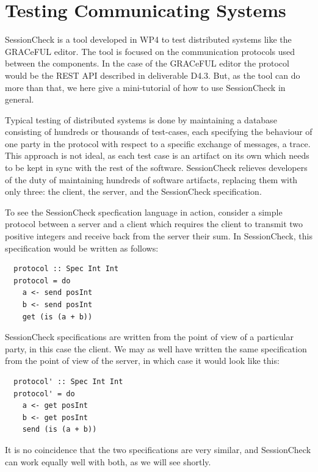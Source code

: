 \documentclass{article}
\begin{document}


\section{Testing Communicating Systems}
%
SessionCheck \cite{SessionCheck} is a tool developed in WP4 to test distributed systems like
the GRACeFUL editor.
%
The tool is focused on the communication protocols used between the components.
%
In the case of the GRACeFUL editor the protocol would be the REST API described in deliverable D4.3. %
%
But, as the tool can do more than that, we here give a mini-tutorial
of how to use SessionCheck in general.

Typical testing of distributed systems is done by maintaining a database consisting of hundreds
or thousands of test-cases, each specifying the behaviour of one party in the protocol with
respect to a specific exchange of messages, a trace.
%
This approach is not ideal, as each test case is an artifact on its own which needs to be kept
in sync with the rest of the software.
%
SessionCheck relieves developers of the duty of maintaining hundreds of software
artifacts, replacing them with only three: the client, the server, and the SessionCheck specification.

To see the SessionCheck specfication language in action, consider a
simple protocol between a server and a client which requires the
client to transmit two positive integers and receive back from the
server their sum.
%
In SessionCheck, this specification would be written as follows:
%

\begin{verbatim}
  protocol :: Spec Int Int
  protocol = do
    a <- send posInt
    b <- send posInt
    get (is (a + b))
\end{verbatim}

%
SessionCheck specifications are written from the point of view of a particular party, in this case the client.
%
We may as well have written the same specification from the point of view of the server,
in which case it would look like this:
%

\begin{verbatim}
  protocol' :: Spec Int Int
  protocol' = do
    a <- get posInt
    b <- get posInt
    send (is (a + b))
  \end{verbatim}

%
It is no coincidence that the two specifications are very similar, and SessionCheck can work equally well with
both, as we will see shortly.
\end{document}
